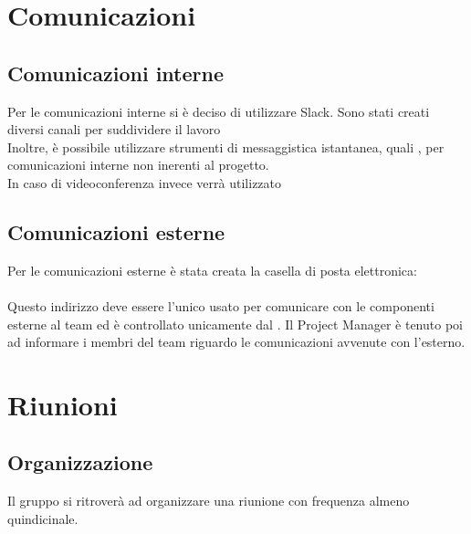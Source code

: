 \section{Comunicazioni}
	\subsection{Comunicazioni interne}
	Per le comunicazioni interne si è deciso di utilizzare Slack. Sono stati creati diversi canali per suddividere il lavoro \\
	Inoltre, è possibile utilizzare strumenti di messaggistica istantanea, quali , per comunicazioni interne non inerenti al progetto. \\
	In caso di videoconferenza invece verrà utilizzato 	
	\subsection{Comunicazioni esterne}
	Per le comunicazioni esterne è stata creata la casella di posta elettronica: \\
	 \\
	Questo indirizzo deve essere l'unico usato per comunicare con le componenti esterne al team ed è controllato unicamente dal . Il Project Manager è tenuto poi ad informare i membri del team riguardo le comunicazioni avvenute con l'esterno.

\section{Riunioni}
	\subsection{Organizzazione}
	Il gruppo si ritroverà ad organizzare una riunione con frequenza almeno quindicinale. \\
	
	